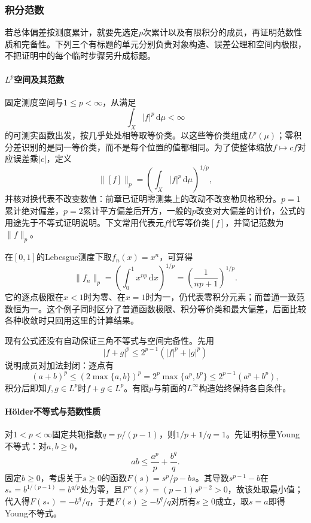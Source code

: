 \subsubsection{积分范数}
\label{subsubsec:integral-norms}

若总体偏差按测度累计，就要先选定$p$次累计以及有限积分的成员，再证明范数性质和完备性。下列三个有标题的单元分别负责对象构造、误差公理和空间内极限，不把证明中的每个临时步骤另升成标题。

\paragraph{$L^p$空间及其范数}

固定测度空间与$1\le p<\infty$，从满足
\[
  \int_X|f|^p\,\mathrm d\mu<\infty
\]
的可测实函数出发，按几乎处处相等取等价类。以这些等价类组成$L^p(\mu)$；零积分差识别的是同一等价类，而不是每个位置的值都相同。为了使整体缩放$f\mapsto cf$对应误差乘$|c|$，定义
\[
  \|[f]\|_p=\left(\int_X|f|^p\,\mathrm d\mu\right)^{1/p},
\]
并核对换代表不改变数值：前章已证明零测集上的改动不改变勒贝格积分。$p=1$累计绝对偏差，$p=2$累计平方偏差后开方，一般的$p$改变对大偏差的计价，公式的用途先于不等式证明说明。下文常用代表元$f$代写等价类$[f]$，并简记范数为$\|f\|_p$。

在$[0,1]$的Lebesgue测度下取$f_n(x)=x^n$，可算得
\[
  \|f_n\|_p=\left(\int_0^1x^{np}\,\mathrm dx\right)^{1/p}
  =\left(\frac{1}{np+1}\right)^{1/p}.
\]
它的逐点极限在$x<1$时为零、在$x=1$时为一，仍代表零积分元素；而普通一致范数恒为一。这个例子同时区分了普通函数极限、积分等价类和最大偏差，后面比较各种收敛时只回用这里的计算结果。

现有公式还没有自动保证三角不等式与空间完备性。先用
\[
  |f+g|^p\le 2^{p-1}(|f|^p+|g|^p)
\]
说明成员对加法封闭：逐点有
\[
  (a+b)^p\le(2\max\{a,b\})^p=2^p\max\{a^p,b^p\}\le2^{p-1}(a^p+b^p),
\]
积分后即知$f,g\in L^p$时$f+g\in L^p$。有限$p$与前面的$L^\infty$构造始终保持各自条件。

\paragraph{Hölder不等式与范数性质}

对$1<p<\infty$固定共轭指数$q=p/(p-1)$，则$1/p+1/q=1$。先证明标量Young不等式：对$a,b\ge0$，
\[
  ab\le\frac{a^p}{p}+\frac{b^q}{q}.
\]
固定$b\ge0$，考虑关于$s\ge0$的函数$F(s)=s^p/p-bs$。其导数$s^{p-1}-b$在$s_*=b^{1/(p-1)}=b^{q/p}$处为零，且$F''(s)=(p-1)s^{p-2}>0$，故该处取最小值；代入得$F(s_*)=-b^q/q$，于是$F(s)\ge-b^q/q$对所有$s\ge0$成立，取$s=a$即得Young不等式。

